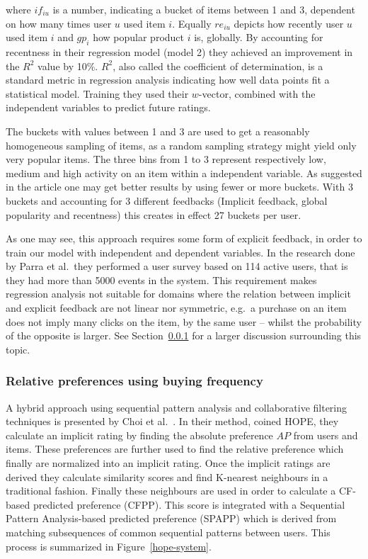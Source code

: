 where $if_{iu}$ is a number, indicating a bucket of items between 1 and 3,
dependent on how many times user $u$ used item $i$. Equally $re_{iu}$ depicts
how recently user $u$ used item $i$ and $gp_{i}$ how popular product $i$ is,
globally. By accounting for recentness in their regression model (model 2)
they achieved an improvement in the $R^2$ value by 10\%. $R^2$, also called the
coefficient of determination, is a standard metric in regression analysis
indicating how well data points fit a statistical model. Training they used
their $w$-vector, combined with the independent variables to predict future
ratings.

The buckets with values between 1 and 3 are used to get a reasonably
homogeneous sampling of items, as a random sampling strategy might yield only
very popular items. The three bins from 1 to 3 represent respectively low,
medium and high activity on an item within a independent variable. As suggested
in the article one may get better results by using fewer or more buckets. With
3 buckets and accounting for 3 different feedbacks (Implicit feedback, global
popularity and recentness) this creates in effect 27 buckets per user.

As one may see, this approach requires some form of explicit feedback, in order
to train our model with independent and dependent variables. In the research
done by Parra et al.\ they performed a user survey based on 114 active users,
that is they had more than 5000 events in the system. This requirement makes
regression analysis not suitable for domains where the relation between
implicit and explicit feedback are not linear nor symmetric, e.g.\ a purchase on
an item does not imply many clicks on the item, by the same user – whilst the
probability of the opposite is larger. See Section~\ref{} for a larger
discussion surrounding this topic. %

\subsubsection{Relative preferences using buying frequency}

A hybrid approach using sequential pattern analysis and collaborative filtering
techniques is presented by Choi et al.~\cite{choi2012hybrid}. In their
method, coined HOPE, they calculate an implicit rating by finding the
absolute preference $AP$ from users and items. These preferences are further
used to find the relative preference which finally are normalized into an
implicit rating. Once the implicit ratings are derived they calculate
similarity scores and find K-nearest neighbours in a traditional fashion.
Finally these neighbours are used in order to calculate a CF-based predicted
preference (CFPP). This score is integrated with a Sequential Pattern
Analysis-based predicted preference (SPAPP) which is derived from matching
subsequences of common sequential patterns between users. This process is
summarized in Figure~\ref{hope-system}.

